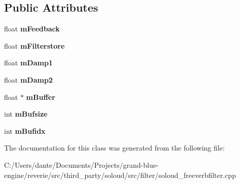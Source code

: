 \subsection*{Public Attributes}
\begin{DoxyCompactItemize}
\item 
\mbox{\label{class_so_loud_1_1_freeverb_impl_1_1_comb_a35f133c833183f277b1ab4f709b5e747}} 
float {\bfseries m\+Feedback}
\item 
\mbox{\label{class_so_loud_1_1_freeverb_impl_1_1_comb_a40e361c4664d2c4f8d91ee858e1e3696}} 
float {\bfseries m\+Filterstore}
\item 
\mbox{\label{class_so_loud_1_1_freeverb_impl_1_1_comb_afe929b55e7b07eef278686336231a6e9}} 
float {\bfseries m\+Damp1}
\item 
\mbox{\label{class_so_loud_1_1_freeverb_impl_1_1_comb_a11d89ef1aa05f63ae6e5fd0095487930}} 
float {\bfseries m\+Damp2}
\item 
\mbox{\label{class_so_loud_1_1_freeverb_impl_1_1_comb_a79cf6d715082f1b5697a7bb20237e0a8}} 
float $\ast$ {\bfseries m\+Buffer}
\item 
\mbox{\label{class_so_loud_1_1_freeverb_impl_1_1_comb_a7bd8113ba9b6f49abf54204ff55e6497}} 
int {\bfseries m\+Bufsize}
\item 
\mbox{\label{class_so_loud_1_1_freeverb_impl_1_1_comb_a47f9af375eed96bd11c871a1bd6b39fb}} 
int {\bfseries m\+Bufidx}
\end{DoxyCompactItemize}


The documentation for this class was generated from the following file\+:\begin{DoxyCompactItemize}
\item 
C\+:/\+Users/dante/\+Documents/\+Projects/grand-\/blue-\/engine/reverie/src/third\+\_\+party/soloud/src/filter/soloud\+\_\+freeverbfilter.\+cpp\end{DoxyCompactItemize}
